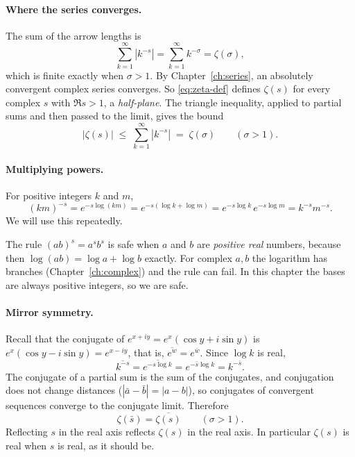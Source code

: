 \paragraph{Where the series converges.} The sum of the arrow lengths is
\[
\sum_{k=1}^\infty|k^{-s}|=\sum_{k=1}^{\infty}k^{-\sigma}=\zeta(\sigma),
\]
which is finite exactly when $\sigma>1$. By Chapter~\ref{ch:series}, an absolutely convergent complex series converges. So \cref{eq:zeta-def} defines $\zeta(s)$ for every complex $s$ with $\Re s>1$, a \emph{half-plane}. The triangle inequality, applied to partial sums and then passed to the limit, gives the bound
\begin{equation}
|\zeta(s)|\;\le\;\sum_{k=1}^\infty |k^{-s}|\;=\;\zeta(\sigma)\qquad(\sigma>1).
\label{eq:zeta-modbound}
\end{equation}

\paragraph{Multiplying powers.} For positive integers $k$ and $m$,
\[
(km)^{-s}=e^{-s\log(km)}=e^{-s(\log k+\log m)}=e^{-s\log k}\,e^{-s\log m}=k^{-s}m^{-s}.
\]
We will use this repeatedly.

\begin{pitfall}
The rule $(ab)^s=a^sb^s$ is safe when $a$ and $b$ are \emph{positive real} numbers, because then $\log(ab)=\log a+\log b$ exactly. For complex $a,b$ the logarithm has branches (Chapter~\ref{ch:complex}) and the rule can fail. In this chapter the bases are always positive integers, so we are safe.
\end{pitfall}

\paragraph{Mirror symmetry.} Recall that the conjugate of $e^{x+iy}=e^x(\cos y+i\sin y)$ is $e^x(\cos y-i\sin y)=e^{x-iy}$, that is, $\overline{e^{w}}=e^{\bar w}$. Since $\log k$ is real,
\[
\overline{k^{-s}}=\overline{e^{-s\log k}}=e^{-\bar s\log k}=k^{-\bar s}.
\]
The conjugate of a partial sum is the sum of the conjugates, and conjugation does not change distances ($|\bar a-\bar b|=|a-b|$), so conjugates of convergent sequences converge to the conjugate limit. Therefore
\begin{equation}
\zeta(\bar s)=\overline{\zeta(s)}\qquad(\sigma>1).
\label{eq:zeta-conj}
\end{equation}
Reflecting $s$ in the real axis reflects $\zeta(s)$ in the real axis. In particular $\zeta(s)$ is real when $s$ is real, as it should be.

